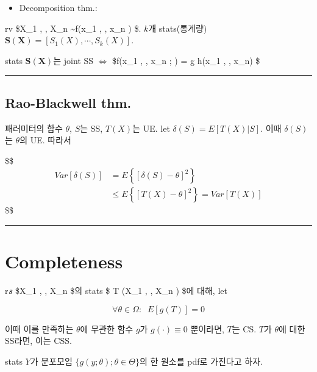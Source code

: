 \documentclass[
]{book}
\providecommand{\tightlist}{%
  \setlength{\itemsep}{0pt}\setlength{\parskip}{0pt}}
\begin{document}
\begin{itemize}
\tightlist
\item
  Decomposition thm.:
\end{itemize}

rv \$X\_1 , \cdots, X\_n \sim f(x\_1 , \cdots, x\_n \rvert \theta) \$. \(k\)개 stats(통계량) \(\pmb {S(X)} = \left[ S_1(X), \cdots, S_k(X) \right]\).

stats \(\pmb {S(X)}\)는 joint SS \(\iff\) \$f(x\_1 , \cdots, x\_n ; \theta) = g  \ast h(x\_1 , \cdots, x\_n) \$

\begin{center}\rule{0.5\linewidth}{0.5pt}\end{center}

\hypertarget{rao-blackwell-thm.}{%
\subsection{Rao-Blackwell thm.}\label{rao-blackwell-thm.}}

패러미터의 함수 \(\theta\), \(S\)는 SS, \(T(X)\)는 UE. let \(\delta (S) = E \left [ T(X) \rvert S \right]\). 이때 \(\delta (S)\)는 \(\theta\)의 UE. 따라서

\$\$
\begin{align*}

Var \left[ \delta (S) \right ] &= E \left\{ \left[ \delta (S) - \theta \right]^2 \right\} \\
&\le E \left\{ \left[ T(X) - \theta \right]^2 \right\} = Var \left [ T(X) \right]

\end{align*}
\$\$

\begin{center}\rule{0.5\linewidth}{0.5pt}\end{center}

\hypertarget{completeness}{%
\section{Completeness}\label{completeness}}

r\textbf{\emph{s}} \$X\_1 , \cdots, X\_n \$의 stats \$ T (X\_1 , \cdots, X\_n ) \$에 대해, let

\[
\forall \theta \in \Omega: \; \; E \left[ g(T) \right]=0
\]

이때 이를 만족하는 \(\theta\)에 무관한 함수 \(g\)가 \(g(\cdot) \equiv 0\) 뿐이라면, \(T\)는 CS. \(T\)가 \(\theta\)에 대한 SS라면, 이는 CSS.

stats \(Y\)가 분포모임 \(\{g(y;\theta);\theta \in \Theta \}\)의 한 원소를 pdf로 가진다고 하자.
\end{document}

